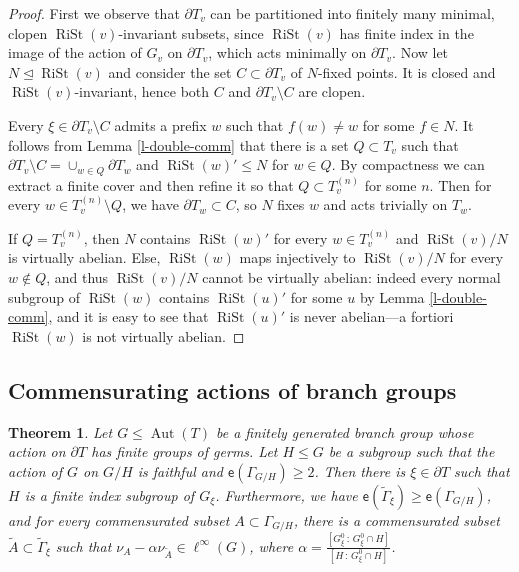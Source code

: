 \documentclass[11pt]{amsart}
\newcommand{\aut}{\ensuremath{\operatorname{Aut}}}%
\newcommand{\rist}{\ensuremath{\operatorname{RiSt}}}%
\newcommand{\Gammatilde}{\ensuremath{\widetilde{\Gamma}}}%
\newcommand{\esf}{\ensuremath{\mathsf{e}}}
\theoremstyle{definition}
\theoremstyle{plain}
\newtheorem{thm}[defin]{Theorem}
\newtheorem{main thm}{Theorem}
\theoremstyle{remark}
\theoremstyle{plain}
\begin{document}
\begin{proof}
First we observe that $\partial T_v$ can be partitioned into finitely many minimal, clopen $\rist(v)$-invariant subsets, since $\rist(v)$ has finite index in the image of the action of $G_v$ on $\partial T_v$, which acts minimally on $\partial T_v$. Now let $N\unlhd \rist(v)$ and consider the set $C\subset \partial T_v$ of $N$-fixed points. It is closed and $\rist(v)$-invariant, hence both $C$ and $\partial T_v\setminus C$ are clopen. 

Every $\xi\in \partial T_v\setminus C$ admits a prefix $w$ such that $f(w)\neq w$ for some $f\in N$. It follows from Lemma \ref{l-double-comm} that there is a set $Q\subset T_v$  such that $\partial T_v\setminus C=\cup_{w\in Q} \partial T_w$ and $\rist(w)'\le N$ for $w\in Q$. By compactness we can extract a finite cover and then refine it so that $ Q\subset T^{(n)}_v$ for some $n$. Then for every $w\in T^{(n)}_v\setminus Q$, we have $\partial T_w\subset C$, so $N$ fixes $w$ and acts trivially on $T_w$.

If $Q=T^{(n)}_v$, then $N$ contains $\rist(w)'$ for every $w\in T^{(n)}_v$ and $\rist(v)/N$ is virtually abelian. Else, $\rist(w)$ maps injectively to $\rist(v)/N$ for every $w\notin Q$, and thus $\rist(v)/N$ cannot be virtually abelian: indeed every normal subgroup of $\rist(w)$ contains $\rist(u)'$ for some $u$ by Lemma \ref{l-double-comm}, and it is easy to see that $\rist(u)'$ is never abelian---a fortiori $\rist(w)$ is not virtually abelian.  \qedhere
    
\end{proof}




\subsection{Commensurating actions of branch groups} \label{s-commensurating-branch}

 
\begin{thm} \label{t-multi-ended-graphs}
Let $G\le \aut(T)$ be a finitely generated branch group whose action on $\partial T$ has finite groups of germs.
Let $H\le G$ be a subgroup such that the action of $G$ on $G/H$ is faithful and $\esf(\Gamma_{G/H})\ge 2$. Then there is $\xi \in \partial T$ such that $H$ is a finite index subgroup of $G_\xi$. Furthermore, we have $\esf(\Gammatilde_\xi)\ge \esf(\Gamma_{G/H})$, and for every commensurated subset $A\subset \Gamma_{G/H}$, there is a commensurated subset $\widetilde{A}\subset \Gammatilde_
\xi$ such that $\nu_A-\alpha\nu_{\widetilde{A}}\in \ell^\infty(G)$, where $\alpha=\frac{[G^0_\xi\,  :\,  G^0_\xi\cap H]}{[H\, : \, G^0_\xi\cap H]}$.



\end{thm}
\end{document}
